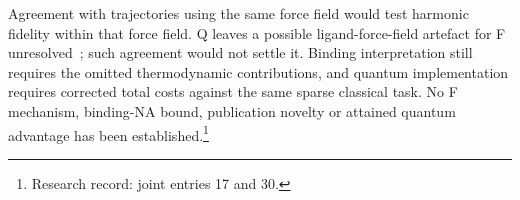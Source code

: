 \documentclass{article}
\begin{document}
Agreement with trajectories using the same force field would test harmonic fidelity within that force field. Q leaves a possible ligand-force-field artefact for F unresolved~\cite{Q}; such agreement would not settle it. Binding interpretation still requires the omitted thermodynamic contributions, and quantum implementation requires corrected total costs against the same sparse classical task. No F mechanism, binding-NA bound, publication novelty or attained quantum advantage has been established.\footnote{Research record: joint entries 17 and 30.}

\clearpage


\end{document}

